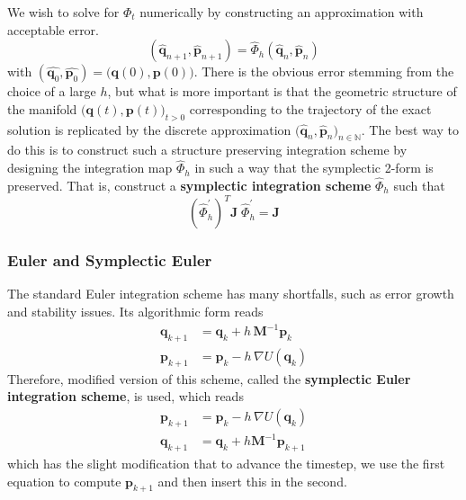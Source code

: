 \documentclass{article}
\begin{document}
    We wish to solve for $\Phi_t$ numerically by constructing an approximation with acceptable error. 
    \begin{equation}
      (\hat{\mathbf{q}}_{n+1}, \hat{\mathbf{p}}_{n+1}) = \hat{\Phi}_{h} (\hat{\mathbf{q}}_{n}, \hat{\mathbf{p}}_{n})
    \end{equation}
    with $(\hat{\mathbf{q}_0}, \hat{\mathbf{p}_0}) = \big( \mathbf{q}(0), \mathbf{p}(0)\big)$. There is the obvious error stemming from the choice of a large $h$, but what is more important is that the geometric structure of the manifold $\big( \mathbf{q}(t), \mathbf{p}(t)\big)_{t > 0}$ corresponding to the trajectory of the exact solution is replicated by the discrete approximation $\big(\hat{\mathbf{q}}_n, \hat{\mathbf{p}}_n\big)_{n \in \mathbb{N}}$. The best way to do this is to construct such a structure preserving integration scheme by designing the integration map $\hat{\Phi}_{h}$ in such a way that the symplectic 2-form is preserved. That is, construct a \textbf{symplectic integration scheme} $\hat{\Phi}_{h}$ such that 
    \begin{equation}
      (\hat{\Phi}_{h}^\prime)^T \mathbf{J} \; \hat{\Phi}_{h}^\prime = \mathbf{J}
    \end{equation}

    \subsubsection{Euler and Symplectic Euler}

      The standard Euler integration scheme has many shortfalls, such as error growth and stability issues. Its algorithmic form reads 
      \begin{align*}
        \mathbf{q}_{k + 1} & = \mathbf{q}_k + h \, \mathbf{M}^{-1} \mathbf{p}_k \\
        \mathbf{p}_{k + 1} & = \mathbf{p}_k - h \, \nabla U(\mathbf{q}_k)
      \end{align*}
      Therefore, modified version of this scheme, called the \textbf{symplectic Euler integration scheme}, is used, which reads 
      \begin{align*}
        \mathbf{p}_{k+1} & = \mathbf{p}_k - h \, \nabla U(\mathbf{q}_k) \\
        \mathbf{q}_{k+1} & = \mathbf{q}_k + h \mathbf{M}^{-1} \mathbf{p}_{k+1} 
      \end{align*}
      which has the slight modification that to advance the timestep, we use the first equation to compute $\mathbf{p}_{k+1}$ and then insert this in the second. 
\end{document}
